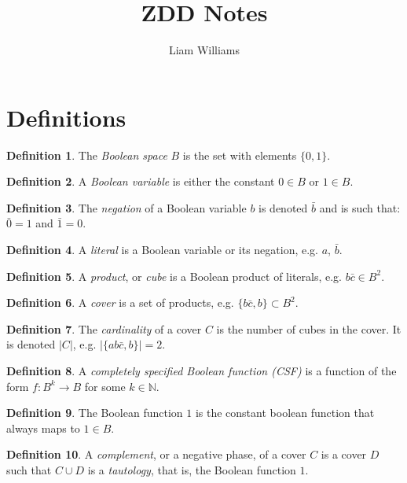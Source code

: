 \documentclass{article}
\title{ZDD Notes}
\author{Liam Williams}
\theoremstyle{definition}
\newtheorem{definition}{Definition}[section]
\newcommand*\negation[1]{\bar{#1}}
\newcommand*\union[1]{\cup{#1}}
\begin{document}
\section{Definitions}

\begin{definition}
The \textit{Boolean space} $B$ is the set with elements $\{0,1\}$.
\end{definition}

\begin{definition}
A \textit{Boolean variable} is either the constant $0 \in B$ or $1 \in B$.
\end{definition}

\begin{definition}
The \textit{negation} of a Boolean variable $b$ is denoted $\negation{b}$ and is such that: $\negation{0} = 1$ and $\negation{1} = 0$.
\end{definition}

\begin{definition}
A \textit{literal} is a Boolean variable or its negation, e.g. $a$, $\negation{b}$.
\end{definition}

\begin{definition}
A \textit{product}, or \textit{cube} is a Boolean product of literals, e.g. $b\negation{c} \in B^2$.
\end{definition}

\begin{definition}
A \textit{cover} is a set of products, e.g. $\{b\negation{c}, b\} \subset B^2$.
\end{definition}

\begin{definition}
The \textit{cardinality} of a cover $C$ is the number of cubes in the cover. It is denoted $|C|$, e.g. $|\{ab\negation{c}, b\}| = 2$.
\end{definition}

\begin{definition}
A \textit{completely specified Boolean function (CSF)} is a function of the form $f:B^k \rightarrow B$ for some $k \in \mathbb{N}$.
\end{definition}

\begin{definition}
The Boolean function $1$ is the constant boolean function that always maps to $1 \in B$.
\end{definition}

\begin{definition}
A \textit{complement}, or a negative phase, of a cover $C$ is a cover $D$ such that $C \union D$ is a \textit{tautology}, that is, the Boolean function $1$.
\end{definition}
\end{document}
